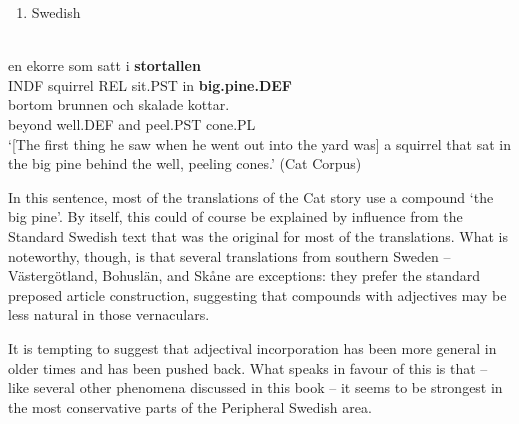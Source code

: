 \begin{enumerate} %
\item 
Swedish

\end{enumerate} %
\ea\label{}
\\


\ea\label{}
\gll en  ekorre  som  satt  i  \textbf{stortallen}\\


INDF  squirrel  REL  sit.PST  in  \textbf{big.pine.DEF}\\ %


\ea\label{}
\gll bortom  brunnen  och  skalade  kottar.\\


beyond  well.DEF  and  peel.PST  cone.PL\\ %


‘[The first thing he saw when he went out into the yard was] a squirrel that sat in the big pine behind the well, peeling cones.’ (Cat Corpus)
\z


In this sentence, most of the translations of the Cat story use a compound  ‘the big pine’. By itself, this could of course be explained by influence from the Standard Swedish text that was the original for most of the translations. What is noteworthy, though, is that several translations from southern Sweden – Västergötland, Bohuslän, and Skåne are exceptions: they prefer the standard preposed article construction, suggesting that compounds with adjectives may be less natural in those vernaculars.

It is tempting to suggest that adjectival incorporation has been more general in older times and has been pushed back. What speaks in favour of this is that – like several other phenomena discussed in this book – it seems to be strongest in the most conservative parts of the Peripheral Swedish area. 

